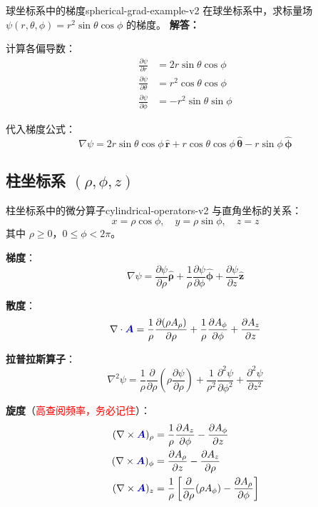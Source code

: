 \documentclass[11pt,a4paper,openany,oneside]{book}
\newcommand{\vecA}{\textcolor{blue!70!black}{\vect{A}}}
\newcommand{\vect}[1]{\bm{#1}}
\newcommand{\unitvec}[1]{\hat{\vect{#1}}}
\newcommand{\grad}{\nabla}
\newcommand{\curl}{\nabla\times}
\newcommand{\divg}{\nabla\cdot}
\newcommand{\lap}{\nabla^2}
\newcommand{\difficulty}[1]{\marginnote{\textcolor{red}{\textbf{[#1]}}}}
\begin{document}
\begin{example}{球坐标系中的梯度}{spherical-grad-example-v2}
\difficulty{提高}
在球坐标系中，求标量场 $\psi(r, \theta, \phi) = r^2 \sin\theta \cos\phi$ 的梯度。
\tcblower
\textbf{解答：}

计算各偏导数：
\begin{align*}
\frac{\partial\psi}{\partial r} &= 2r\sin\theta\cos\phi \\
\frac{\partial\psi}{\partial\theta} &= r^2\cos\theta\cos\phi \\
\frac{\partial\psi}{\partial\phi} &= -r^2\sin\theta\sin\phi
\end{align*}

代入梯度公式：
\[
\grad\psi = 2r\sin\theta\cos\phi \,\unitvec{r} + r\cos\theta\cos\phi \,\unitvec{\theta} - r\sin\phi \,\unitvec{\phi}
\]
\end{example}

\subsection{柱坐标系 \texorpdfstring{$(\rho, \phi, z)$}{(ρ, φ, z)}}

\begin{theorem}{柱坐标系中的微分算子}{cylindrical-operators-v2}
与直角坐标的关系：
\[
x = \rho\cos\phi, \quad y = \rho\sin\phi, \quad z = z
\]
其中 $\rho \geq 0$，$0 \leq \phi < 2\pi$。

\textbf{梯度}：
\[
\grad\psi = \frac{\partial\psi}{\partial\rho}\unitvec{\rho} + \frac{1}{\rho}\frac{\partial\psi}{\partial\phi}\unitvec{\phi} + \frac{\partial\psi}{\partial z}\unitvec{z}
\]

\textbf{散度}：
\[
\divg\vecA = \frac{1}{\rho}\frac{\partial(\rho A_\rho)}{\partial\rho} + \frac{1}{\rho}\frac{\partial A_\phi}{\partial\phi} + \frac{\partial A_z}{\partial z}
\]

\textbf{拉普拉斯算子}：
\[
\lap\psi = \frac{1}{\rho}\frac{\partial}{\partial\rho}\left(\rho\frac{\partial\psi}{\partial\rho}\right) + \frac{1}{\rho^2}\frac{\partial^2\psi}{\partial\phi^2} + \frac{\partial^2\psi}{\partial z^2}
\]

\textbf{旋度}（\textcolor{red}{高查阅频率，务必记住}）：
\begin{align*}
(\curl\vecA)_\rho &= \frac{1}{\rho}\frac{\partial A_z}{\partial\phi} - \frac{\partial A_\phi}{\partial z} \\
(\curl\vecA)_\phi &= \frac{\partial A_\rho}{\partial z} - \frac{\partial A_z}{\partial\rho} \\
(\curl\vecA)_z &= \frac{1}{\rho}\left[\frac{\partial}{\partial\rho}(\rho A_\phi) - \frac{\partial A_\rho}{\partial\phi}\right]
\end{align*}
\end{theorem}
\end{document}
